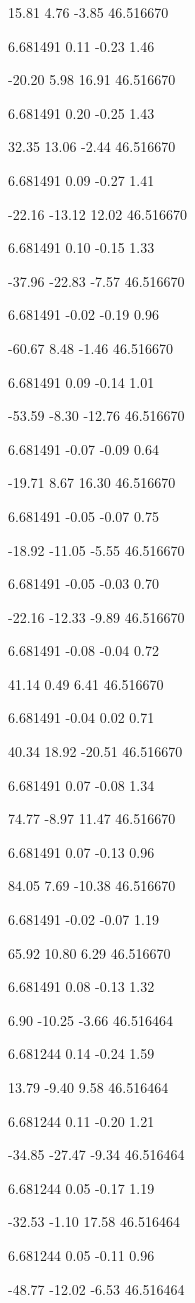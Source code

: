 15.81
4.76
-3.85
46.516670

6.681491
0.11
-0.23
1.46

-20.20
5.98
16.91
46.516670

6.681491
0.20
-0.25
1.43

32.35
13.06
-2.44
46.516670

6.681491
0.09
-0.27
1.41

-22.16
-13.12
12.02
46.516670

6.681491
0.10
-0.15
1.33

-37.96
-22.83
-7.57
46.516670

6.681491
-0.02
-0.19
0.96

-60.67
8.48
-1.46
46.516670

6.681491
0.09
-0.14
1.01

-53.59
-8.30
-12.76
46.516670

6.681491
-0.07
-0.09
0.64

-19.71
8.67
16.30
46.516670

6.681491
-0.05
-0.07
0.75

-18.92
-11.05
-5.55
46.516670

6.681491
-0.05
-0.03
0.70

-22.16
-12.33
-9.89
46.516670

6.681491
-0.08
-0.04
0.72

41.14
0.49
6.41
46.516670

6.681491
-0.04
0.02
0.71

40.34
18.92
-20.51
46.516670

6.681491
0.07
-0.08
1.34

74.77
-8.97
11.47
46.516670

6.681491
0.07
-0.13
0.96

84.05
7.69
-10.38
46.516670

6.681491
-0.02
-0.07
1.19

65.92
10.80
6.29
46.516670

6.681491
0.08
-0.13
1.32

6.90
-10.25
-3.66
46.516464

6.681244
0.14
-0.24
1.59

13.79
-9.40
9.58
46.516464

6.681244
0.11
-0.20
1.21

-34.85
-27.47
-9.34
46.516464

6.681244
0.05
-0.17
1.19

-32.53
-1.10
17.58
46.516464

6.681244
0.05
-0.11
0.96

-48.77
-12.02
-6.53
46.516464

